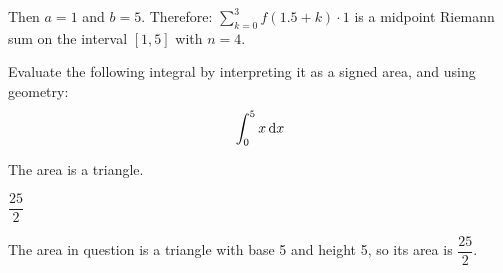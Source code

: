 \begin{solution}
\begin{description}
\begin{center}
\end{center}

Then $a=1$ and $b=5$. Therefore: $\sum\limits_{k=0}^3 f (1.5 + k) \cdot 1$ is a midpoint Riemann sum on the interval $[1,5]$ with $n=4$.

\end{description}
\end{solution}

\begin{question}
Evaluate the following integral by interpreting it as a signed area, and using geometry:
\[\int_0^5 x \,\mathrm{d}x\]
\end{question}
\begin{hint}
The area is a triangle.
\end{hint}
\begin{answer}
$\dfrac{25}{2}$
\end{answer}
\begin{solution}
The area in question is a triangle with base 5 and height 5, so its area is $\dfrac{25}{2}$.
\begin{center}
\end{center}
\end{solution}



